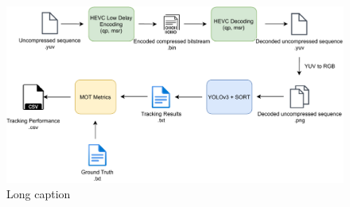\begin{figure}[htb]
  \centering
  \includegraphics[width=1.0\linewidth]{img/experiment_pipeline.pdf}
  \caption[Experimental Pipeline]{
  Long caption
  }
  \label{fig:experiment_pipeline}
\end{figure}
